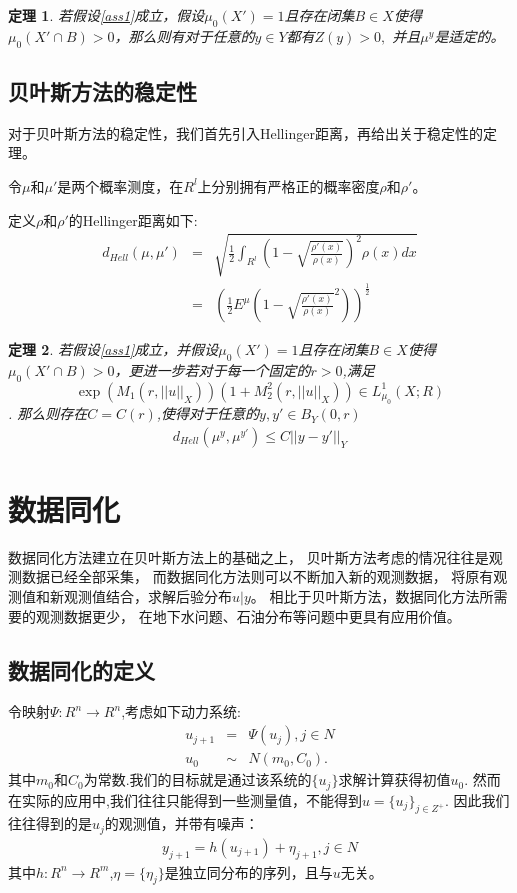 \documentclass[a4paper,12pt,oneside,CJK]{cctbook}
\newtheorem{thm}  {\indent 定理}[section]
\theoremstyle{definition}
\numberwithin{equation}{section}
\begin{document}
\begin{thm}
若假设\ref{ass1}成立，假设$\mu_0(X')=1$且存在闭集$B\in X$使得
$\mu_0(X'\cap B)>0$，那么则有对于任意的$y\in Y$都有$Z(y)>0,$ 并且$\mu^y$是适定的。
\end{thm}

\subsection{贝叶斯方法的稳定性}

对于贝叶斯方法的稳定性，我们首先引入Hellinger距离，再给出关于稳定性的定理。

令$\mu$和$\mu'$是两个概率测度，在$R^l$上分别拥有严格正的概率密度$\rho$和$\rho'$。

定义$\rho$和$\rho'$的Hellinger距离如下:
\begin{eqnarray*}
    d_{Hell}(\mu,\mu ')&=&\sqrt{\frac{1}{2}\int_{R^l}(1-\sqrt{\frac{\rho'(x)}{\rho(x)}})^2\rho(x)dx}\\
    &=&(\frac{1}{2}E^{\mu}(1-\sqrt{\frac{\rho'(x)}{\rho(x)}}^2))^{\frac{1}{2}}
\end{eqnarray*}

\begin{thm} 若假设\ref{ass1}成立，并假设$\mu_0(X')=1$且存在闭集$B\in X$使得
$\mu_0(X'\cap B)>0$，更进一步若对于每一个固定的$r>0$,满足
$$\exp(M_1(r,||u||_X))(1+M_2^2(r,||u||_X))\in L_{\mu_0}^1(X;R)$$.
那么则存在$C=C(r)$,使得对于任意的$y,y'\in B_Y(0,r)$
\begin{eqnarray*}
   d_{Hell}(\mu^y,\mu^{y'})\leq C ||y-y'||_Y
\end{eqnarray*}
\end{thm}

\section{数据同化}

数据同化方法建立在贝叶斯方法上的基础之上，
贝叶斯方法考虑的情况往往是观测数据已经全部采集，
而数据同化方法则可以不断加入新的观测数据，
将原有观测值和新观测值结合，求解后验分布$u|y$。
相比于贝叶斯方法，数据同化方法所需要的观测数据更少，
在地下水问题、石油分布等问题中更具有应用价值。

\subsection{数据同化的定义}

令映射$\Psi:R^n\rightarrow R^n$,考虑如下动力系统:
\begin{eqnarray*}
    u_{j+1}&=&\Psi(u_j), j\in N\\
    u_0&\sim& N(m_0,C_0).
\end{eqnarray*}
其中$m_0$和$C_0$为常数.我们的目标就是通过该系统的$\{u_j\}$求解计算获得初值$u_0.$
然而在实际的应用中,我们往往只能得到一些测量值，不能得到$u=\{u_j\}_{j\in Z^+}$.
因此我们往往得到的是$u_j$的观测值，并带有噪声：
\begin{eqnarray*}
  y_{j+1}=h(u_{j+1})+\eta_{j+1},j\in N
\end{eqnarray*}
其中$h:R^n\rightarrow R^m$,$\eta=\{\eta_j\}$是独立同分布的序列，且与$u$无关。
\end{document}
